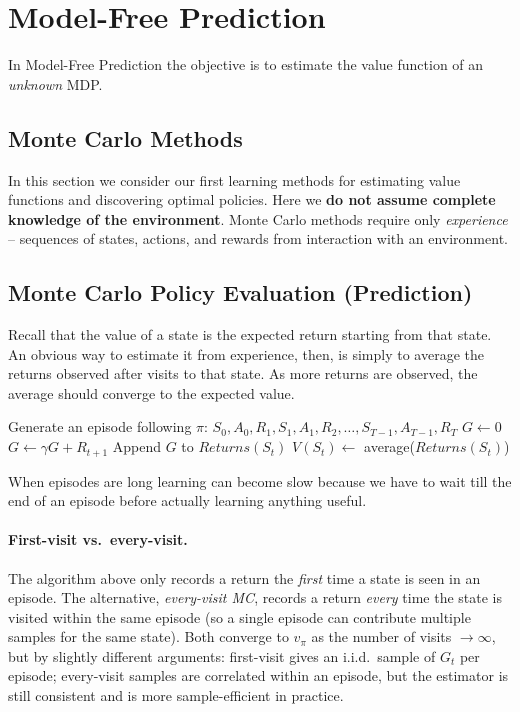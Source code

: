 \section{Model-Free Prediction}
In Model-Free Prediction the objective is to estimate the value function of an \emph{unknown} MDP.

\subsection{Monte Carlo Methods}
In this section we consider our first learning methods for estimating value functions and discovering optimal policies. Here we \textbf{do not assume complete knowledge of the environment}. Monte Carlo methods require only \emph{experience} -- sequences of states, actions, and rewards from interaction with an environment.

\subsection{Monte Carlo Policy Evaluation (Prediction)}
Recall that the value of a state is the expected return starting from that state. An obvious way to estimate it from experience, then, is simply to average the returns observed after visits to that state. As more returns are observed, the average should converge to the expected value.

\begin{algorithm}
    \caption{First-visit MC prediction for estimating $V \approx v_\pi$}
    \begin{algorithmic}[1]
        \Loop
            \State Generate an episode following $\pi$: $S_0, A_0, R_1, S_1, A_1, R_2, \dots, S_{T-1}, A_{T-1}, R_T$
            \State $G \gets 0$
                \State $G \gets \gamma G + R_{t+1}$
                    \State Append $G$ to $Returns(S_t)$
                    \State $V(S_t) \gets$ average($Returns(S_t)$)
                \EndIf
            \EndFor
        \EndLoop
    \end{algorithmic}
\end{algorithm}

When episodes are long learning can become slow because we have to wait till the end of an episode before actually learning anything useful.

\paragraph{First-visit vs.\ every-visit.} The algorithm above only records a return the
\emph{first} time a state is seen in an episode. The alternative, \emph{every-visit MC},
records a return \emph{every} time the state is visited within the same episode (so a
single episode can contribute multiple samples for the same state). Both converge to
$v_\pi$ as the number of visits $\to \infty$, but by slightly different arguments:
first-visit gives an i.i.d.\ sample of $G_t$ per episode;
every-visit samples are correlated within an episode, but the estimator is still
consistent and is more sample-efficient in practice.


